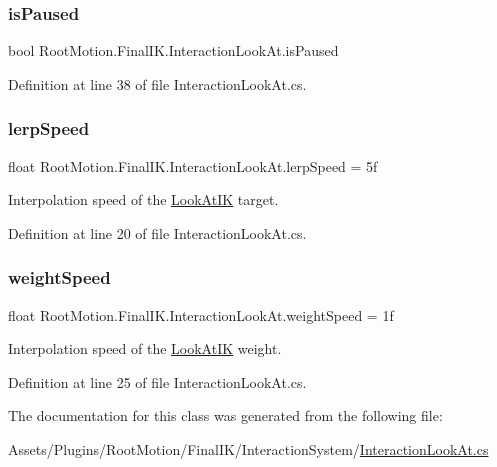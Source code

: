 \subsubsection{\texorpdfstring{is\+Paused}{isPaused}}
{\footnotesize\ttfamily bool Root\+Motion.\+Final\+I\+K.\+Interaction\+Look\+At.\+is\+Paused}



Definition at line 38 of file Interaction\+Look\+At.\+cs.

\mbox{\label{class_root_motion_1_1_final_i_k_1_1_interaction_look_at_ac2663e9992461e3f251e04d5aad251ab}} 
\subsubsection{\texorpdfstring{lerp\+Speed}{lerpSpeed}}
{\footnotesize\ttfamily float Root\+Motion.\+Final\+I\+K.\+Interaction\+Look\+At.\+lerp\+Speed = 5f}



Interpolation speed of the \mbox{\hyperlink{class_root_motion_1_1_final_i_k_1_1_look_at_i_k}{Look\+At\+IK}} target. 



Definition at line 20 of file Interaction\+Look\+At.\+cs.

\mbox{\label{class_root_motion_1_1_final_i_k_1_1_interaction_look_at_a243f6344a62b65c07dd93bf99b0677da}} 
\subsubsection{\texorpdfstring{weight\+Speed}{weightSpeed}}
{\footnotesize\ttfamily float Root\+Motion.\+Final\+I\+K.\+Interaction\+Look\+At.\+weight\+Speed = 1f}



Interpolation speed of the \mbox{\hyperlink{class_root_motion_1_1_final_i_k_1_1_look_at_i_k}{Look\+At\+IK}} weight. 



Definition at line 25 of file Interaction\+Look\+At.\+cs.



The documentation for this class was generated from the following file\+:\begin{DoxyCompactItemize}
\item 
Assets/\+Plugins/\+Root\+Motion/\+Final\+I\+K/\+Interaction\+System/\mbox{\hyperlink{_interaction_look_at_8cs}{Interaction\+Look\+At.\+cs}}\end{DoxyCompactItemize}

